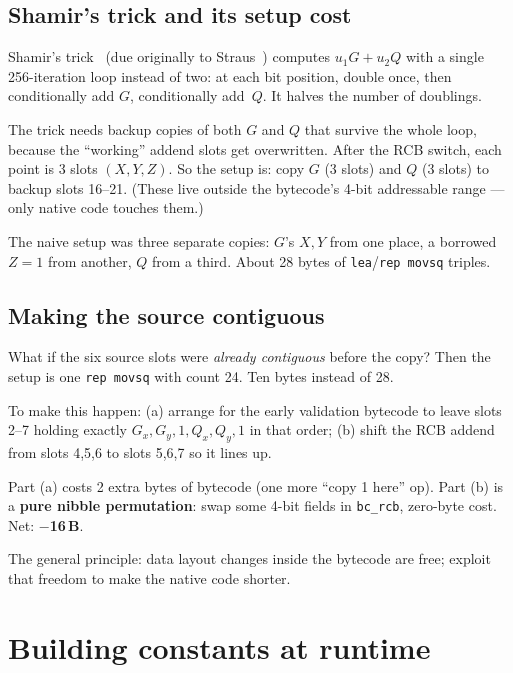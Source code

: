 \documentclass[11pt,a4paper]{article}
\newcommand{\saved}[1]{\textcolor{green!50!black}{\textbf{$-$#1\,B}}}
\begin{document}
\subsection{Shamir's trick and its setup cost}

Shamir's trick~\cite[\S 14.88]{hac} (due originally to
Straus~\cite{straus}) computes $u_1 G + u_2 Q$ with a single
256-iteration loop instead of two: at each bit
position, double once, then conditionally add $G$, conditionally
add~$Q$. It halves the number of doublings.

The trick needs backup copies of both $G$ and $Q$ that survive the
whole loop, because the ``working'' addend slots get overwritten.
After the RCB switch, each point is 3 slots $(X, Y, Z)$. So the
setup is: copy $G$ (3 slots) and $Q$ (3 slots) to backup slots
16--21. (These live outside the bytecode's 4-bit addressable range
--- only native code touches them.)

The naive setup was three separate copies: $G$'s $X,Y$ from one
place, a borrowed $Z=1$ from another, $Q$ from a third. About 28
bytes of \texttt{lea}/\texttt{rep movsq} triples.

\subsection{Making the source contiguous}

What if the six source slots were \emph{already contiguous} before
the copy? Then the setup is one \texttt{rep movsq} with count 24.
Ten bytes instead of 28.

To make this happen: (a) arrange for the early validation bytecode
to leave slots 2--7 holding exactly $G_x, G_y, 1, Q_x, Q_y, 1$ in
that order; (b) shift the RCB addend from slots 4,5,6 to slots
5,6,7 so it lines up.

Part (a) costs 2 extra bytes of bytecode (one more ``copy 1 here''
op). Part (b) is a \textbf{pure nibble permutation}: swap some
4-bit fields in \texttt{bc\_rcb}, zero-byte cost. Net: \saved{16}.

The general principle: data layout changes inside the bytecode are
free; exploit that freedom to make the native code shorter.

\section{Building constants at runtime}
\label{sec:runtimecp}
\end{document}
